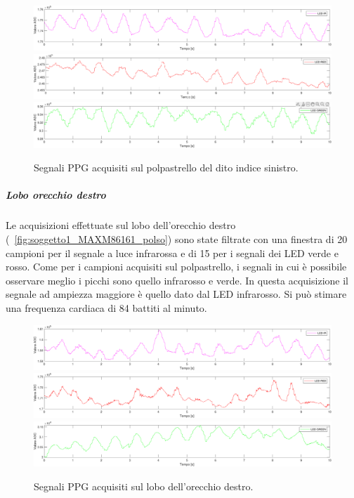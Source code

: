 \begin{figure}[h]
	\centering
	\includegraphics[width=1\linewidth]{ImageFiles/Misure Preliminari/Soggetto 1/MAXM86161/polpastrello_ired}
	\includegraphics[width=1\linewidth]{ImageFiles/Misure Preliminari/Soggetto 1/MAXM86161/polpastrello_red}
	\includegraphics[width=1\linewidth]{ImageFiles/Misure Preliminari/Soggetto 1/MAXM86161/polpastrello_green}
	\caption{Segnali PPG acquisiti sul polpastrello del dito indice sinistro.}
	\label{fig:soggetto1_MAXM86161_polpastrello}
\end{figure}

\clearpage

\subparagraph{Lobo orecchio destro}

Le acquisizioni effettuate sul lobo dell'orecchio destro (\Fig~\ref{fig:soggetto1_MAXM86161_polso}) sono state filtrate con una finestra di 20 campioni per il segnale a luce infrarossa e di 15 per i segnali dei LED verde e rosso. Come per i campioni acquisiti sul polpastrello, i segnali in cui è possibile osservare meglio i picchi sono quello infrarosso e verde. In questa acquisizione il segnale ad ampiezza maggiore è quello dato dal LED infrarosso. Si può stimare una frequenza cardiaca di 84 battiti al minuto.

\begin{figure}[h]
	\centering
	\includegraphics[width=1\linewidth]{ImageFiles/Misure Preliminari/Soggetto 1/MAXM86161/lobo_ired}
	\includegraphics[width=1\linewidth]{ImageFiles/Misure Preliminari/Soggetto 1/MAXM86161/lobo_red}
	\includegraphics[width=1\linewidth]{ImageFiles/Misure Preliminari/Soggetto 1/MAXM86161/lobo_green}
	\caption{Segnali PPG acquisiti sul lobo dell'orecchio destro.}
	\label{fig:soggetto1_MAXM86161_lobo}
\end{figure}

